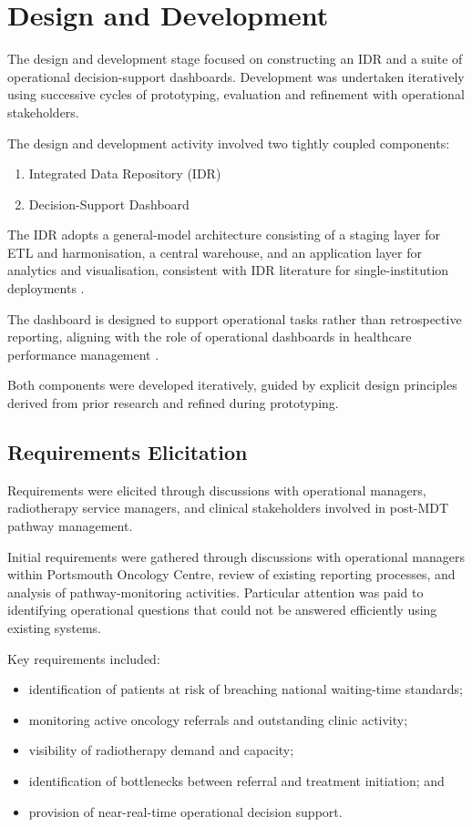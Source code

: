 \section{Design and Development}

The design and development stage focused on constructing an IDR and a suite of operational decision-support dashboards. Development was undertaken iteratively using successive cycles of prototyping, evaluation and refinement with operational stakeholders. 

The design and development activity involved two tightly coupled components:
\begin{enumerate}
    \item Integrated Data Repository (IDR)
    \item Decision-Support Dashboard
\end{enumerate}
The IDR adopts a general-model architecture consisting of a staging layer for ETL and harmonisation, a central warehouse, and an application layer for analytics and visualisation, consistent with IDR literature for single-institution deployments \citep{gagalova2020}.

The dashboard is designed to support operational tasks rather than retrospective reporting, aligning with the role of operational dashboards in healthcare performance management \citep{buttigieg2017}. 

Both components were developed iteratively, guided by explicit design principles derived from prior research and refined during prototyping. 

\subsection{Requirements Elicitation}

Requirements were elicited through discussions with operational managers, radiotherapy service managers, and clinical stakeholders involved in post-MDT pathway management.

Initial requirements were gathered through discussions with operational managers within Portsmouth Oncology Centre, review of existing reporting processes, and analysis of pathway-monitoring activities. Particular attention was paid to identifying operational questions that could not be answered efficiently using existing systems. 

Key requirements included:
\begin{itemize}
    \item identification of patients at risk of breaching national waiting-time standards;
    \item monitoring active oncology referrals and outstanding clinic activity;
    \item visibility of radiotherapy demand and capacity;
    \item identification of bottlenecks between referral and treatment initiation; and
    \item provision of near-real-time operational decision support.
\end{itemize}

